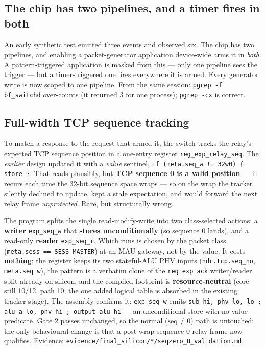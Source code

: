 \documentclass[10pt,a4paper,oneside]{article}
\newcommand{\code}[1]{\texttt{\small #1}}
\begin{document}
\subsection{The chip has two pipelines, and a timer fires in both}

An early synthetic test emitted three events and observed six. The chip has two pipelines,
and enabling a packet-generator application device-wide arms it in \emph{both}. A
pattern-triggered application is masked from this --- only one pipeline sees the trigger ---
but a timer-triggered one fires everywhere it is armed. Every generator write is now scoped
to one pipeline. From the same session: \code{pgrep -f bf\_switchd} over-counts (it returned
3 for one process); \code{pgrep -cx} is correct.

\subsection{Full-width TCP sequence tracking}

To match a response to the request that armed it, the switch tracks the relay's expected TCP
sequence position in a one-entry register \code{reg\_exp\_relay\_seq}. The \emph{earlier}
design updated it with a \emph{value} sentinel, \code{if (meta.seq\_w != 32w0) \{ store \}}.
That reads plausibly, but \textbf{TCP sequence 0 is a valid position} --- it recurs each time
the 32-bit sequence space wraps --- so on the wrap the tracker silently declined to update,
kept a stale expectation, and would forward the next relay frame \emph{unprotected}. Rare, but
structurally wrong.

The program splits the single read-modify-write into two class-selected actions: a
\textbf{writer} \code{exp\_seq\_w} that \textbf{stores unconditionally} (so sequence 0 lands),
and a read-only \textbf{reader} \code{exp\_seq\_r}. Which runs is chosen by the packet class
(\code{meta.sess == SESS\_MASTER}) at an MAU gateway, not by the value. It costs
\textbf{nothing}: the register keeps its two stateful-ALU PHV inputs
(\code{hdr.tcp.seq\_no}, \code{meta.seq\_w}), the pattern is a verbatim clone of the
\code{reg\_exp\_ack} writer/reader split already on silicon, and the compiled footprint is
\textbf{resource-neutral} (core still 10/12, path 10; the one added logical table is absorbed
in the existing tracker stage). The assembly confirms it: \code{exp\_seq\_w} emits
\code{sub hi, phv\_lo, lo ; alu\_a lo, phv\_hi ; output alu\_hi} --- an unconditional store
with no value predicate. Gate 2 passes unchanged, so the normal ($\text{seq}\ne 0$) path is
untouched; the only behavioural change is that a post-wrap sequence-0 relay frame now
qualifies. Evidence: \code{evidence/final\_silicon/*/seqzero\_B\_validation.md}.
\end{document}
